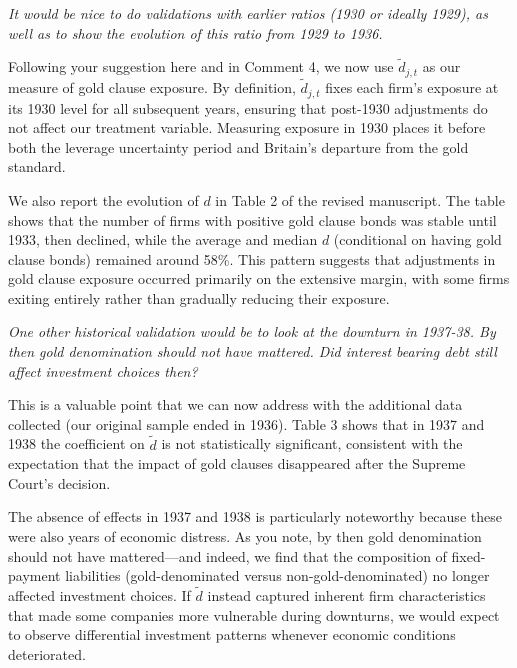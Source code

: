 \bigskip

\textit{\textcolor{red!60!black}{
It would be nice to do validations with earlier ratios (1930 or ideally 1929), as well as to show the evolution of this ratio from 1929 to 1936.
}}

\bigskip

\noindent Following your suggestion here and in Comment 4, we now use $\tilde{d}_{j,t}$ as our measure of gold clause exposure. By definition, $\tilde{d}_{j,t}$ fixes each firm's exposure at its 1930 level for all subsequent years, ensuring that post-1930 adjustments do not affect our treatment variable. Measuring exposure in 1930 places it before both the leverage uncertainty period and Britain's departure from the gold standard.

We also report the evolution of $d$ in Table 2 of the revised manuscript. The table shows that the number of firms with positive gold clause bonds was stable until 1933, then declined, while the average and median $d$ (conditional on having gold clause bonds) remained around 58\%. This pattern suggests that adjustments in gold clause exposure occurred primarily on the extensive margin, with some firms exiting entirely rather than gradually reducing their exposure. 

\bigskip

\textit{\textcolor{red!60!black}{
One other historical validation would be to look at the downturn in 1937-38. By then gold denomination should not have mattered. Did interest bearing debt still affect investment choices then?
}}

\bigskip

\noindent This is a valuable point that we can now address with the additional data collected (our original sample ended in 1936). Table 3 shows that in 1937 and 1938 the coefficient on $\tilde{d}$ is not statistically significant, consistent with the expectation that the impact of gold clauses disappeared after the Supreme Court's decision.

The absence of effects in 1937 and 1938 is particularly noteworthy because these were also years of economic distress. As you note, by then gold denomination should not have mattered---and indeed, we find that the composition of fixed-payment liabilities (gold-denominated versus non-gold-denominated) no longer affected investment choices. If $\tilde{d}$ instead captured inherent firm characteristics that made some companies more vulnerable during downturns, we would expect to observe differential investment patterns whenever economic conditions deteriorated. 

